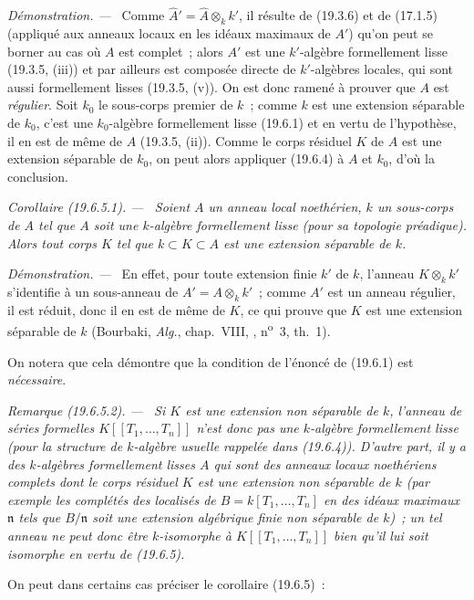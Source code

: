 \documentclass[10pt,oneside]{book}
\makeatletter
\newcommand{\setmanualcurrentlabel}[1]{\def\@currentlabel{#1}}
\newcommand{\oldpage}[2][]{%
  \setcounter{footnote}{0}%
  \marginpar{\scriptsize\textbf{#1}~|~#2}\ignorespaces}
\newenvironment{corollary}[1][]{%
  \setmanualcurrentlabel{#1}\par\medskip\noindent\itshape Corollaire (#1). ---\ }{\par}
\newenvironment{remark}[1][]{%
  \setmanualcurrentlabel{#1}\par\medskip\noindent\itshape Remarque (#1). ---\ }{\par}
\newenvironment{proof}{%
  \par\medskip\noindent\textit{Démonstration. ---\ }}{\par}
\makeatother
\begin{document}
\begin{proof}
Comme $\widehat A'=\widehat A\otimes_k k'$, il résulte de (19.3.6) et de
(17.1.5) (appliqué aux anneaux locaux en les idéaux maximaux de $A'$) qu'on
peut se borner au cas où $A$ est complet~; alors $A'$ est une $k'$-algèbre
formellement lisse (19.3.5, (iii)) et par ailleurs est composée directe de
$k'$-algèbres locales, qui sont aussi formellement lisses (19.3.5, (v)). On est
donc ramené à prouver que $A$ est \emph{régulier}. Soit $k_0$ le sous-corps
premier de $k$~; comme $k$ est une extension séparable de $k_0$, c'est une
$k_0$-algèbre formellement lisse (19.6.1) et en vertu de l'hypothèse, il en est
de même de $A$ (19.3.5, (ii)). Comme le corps résiduel $K$ de $A$ est une
extension séparable de $k_0$, on peut alors appliquer (19.6.4) à $A$ et $k_0$,
d'où la conclusion.
\end{proof}

\oldpage[0\textsubscript{IV-1}]{103}

\begin{corollary}[19.6.5.1]
\label{0.19.6.5.1-fr}
Soient $A$ un anneau local noethérien, $k$ un sous-corps de $A$ tel que $A$
soit une $k$-algèbre formellement lisse (pour sa topologie préadique). Alors
tout corps $K$ tel que $k\subset K\subset A$ est une extension séparable de
$k$.
\end{corollary}

\begin{proof}
En effet, pour toute extension finie $k'$ de $k$, l'anneau $K\otimes_k k'$ 
s'identifie à un sous-anneau de $A'=A\otimes_k k'$~; comme $A'$ est un anneau
régulier, il est réduit, donc il en est de même de $K$, ce qui prouve que $K$
est une extension séparable de $k$ (Bourbaki, \emph{Alg.}, chap.~VIII,
, n\textsuperscript{o}~3, th.~1).
\end{proof}

On notera que cela démontre que la condition de l'énoncé de (19.6.1) est
\emph{nécessaire}.

\begin{remark}[19.6.5.2]
\label{0.19.6.5.2-fr}
Si $K$ est une extension \emph{non séparable} de $k$, l'anneau de séries
formelles $K[[T_1,\ldots,T_n]]$ \emph{n'est donc pas} une $k$-algèbre
formellement lisse (pour la structure de $k$-algèbre usuelle rappelée dans
(19.6.4)). D'autre part, il y a des $k$-algèbres formellement lisses $A$ qui
sont des anneaux locaux noethériens complets dont le corps résiduel $K$ est une
extension \emph{non séparable} de $k$ (par exemple les complétés des localisés
de $B=k[T_1,\ldots,T_n]$ en des idéaux maximaux $\mathfrak n$ tels que
$B/\mathfrak n$ soit une extension algébrique finie non séparable de $k$)~; un
tel anneau ne peut donc être $k$-isomorphe à $K[[T_1,\ldots,T_n]]$ bien qu'il
lui soit isomorphe en vertu de (19.6.5).

On peut dans certains cas préciser le corollaire (19.6.5)~:
\end{remark}
\end{document}
